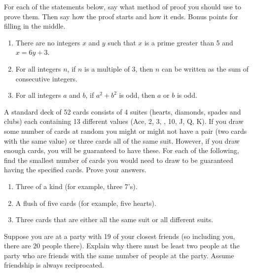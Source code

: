 \documentclass[10pt,]{book}
\theoremstyle{plain}
\theoremstyle{definition}
\theoremstyle{definition}
\theoremstyle{definition}
\theoremstyle{definition}
\numberwithin{equation}{chapter}
\begin{document}
\begin{divisionexercise}{15}\hypertarget{exercise-250}{}
\hypertarget{p-2177}{}%
For each of the statements below, say what method of proof you should use to prove them. Then say how the proof starts and how it ends. Bonus points for filling in the middle.%
\par
\hypertarget{p-2178}{}%
\leavevmode%
\begin{enumerate}[label=(\alph*)]
\item\hypertarget{li-714}{}\hypertarget{p-2179}{}%
There are no integers \(x\) and \(y\) such that \(x\) is a prime greater than 5 and \(x = 6y + 3\).%
\item\hypertarget{li-715}{}\hypertarget{p-2180}{}%
For all integers \(n\), if \(n\) is a multiple of 3, then \(n\) can be written as the sum of consecutive integers.%
\item\hypertarget{li-716}{}\hypertarget{p-2181}{}%
For all integers \(a\) and \(b\), if \(a^2 + b^2\) is odd, then \(a\) or \(b\) is odd.%
\end{enumerate}
%
\end{divisionexercise}%
\begin{divisionexercise}{16}\hypertarget{exercise-251}{}
\hypertarget{p-2186}{}%
A standard deck of 52 cards consists of 4 suites (hearts, diamonds, spades and clubs) each containing 13 different values (Ace, 2, 3, \textellipsis{}, 10, J, Q, K). If you draw some number of cards at random you might or might not have a pair (two cards with the same value) or three cards all of the same suit. However, if you draw enough cards, you will be guaranteed to have these. For each of the following, find the smallest number of cards you would need to draw to be guaranteed having the specified cards. Prove your answers.%
\par
\hypertarget{p-2187}{}%
\leavevmode%
\begin{enumerate}[label=(\alph*)]
\item\hypertarget{li-720}{}\hypertarget{p-2188}{}%
Three of a kind (for example, three 7's). %
\item\hypertarget{li-721}{}\hypertarget{p-2189}{}%
A flush of five cards (for example, five hearts). %
\item\hypertarget{li-722}{}\hypertarget{p-2190}{}%
Three cards that are either all the same suit or all different suits. %
\end{enumerate}
%
\end{divisionexercise}%
\begin{divisionexercise}{17}\hypertarget{exercise-252}{}
\hypertarget{p-2191}{}%
Suppose you are at a party with 19 of your closest friends (so including you, there are 20 people there). Explain why there must be least two people at the party who are friends with the same number of people at the party. Assume friendship is always reciprocated.%
\end{divisionexercise}%
\end{document}
